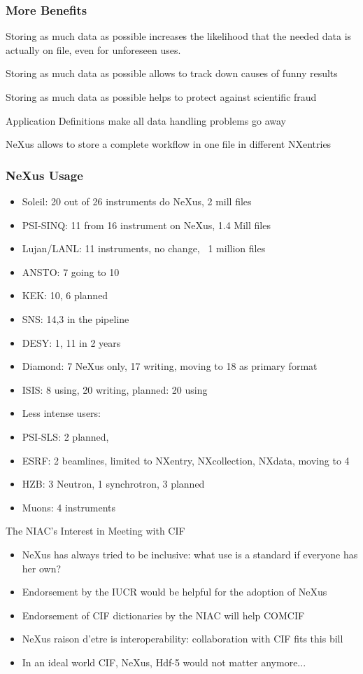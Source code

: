 \documentclass{beamer}
\begin{document}
\begin{frame} \frametitle{More Benefits}
\begin{description}
\item<1->[Benefit 5] Storing as much data as possible increases the likelihood that the needed 
 data is actually on file, even for unforeseen uses. 
\item<2->[Benefit 6] Storing as much data as possible allows to track down causes of funny results 
\item<3->[Benefit 7] Storing as much data as possible helps to protect against scientific fraud
\item<4->[Benefit 8] Application Definitions make all data handling problems go away
\item<4->[Benefit 9] NeXus allows to store a complete workflow in one file in different NXentries
\end{description}
\end{frame}


\begin{frame}
\frametitle{NeXus Usage}
\begin{itemize}
\item Soleil: 20 out of 26 instruments do NeXus, 2 mill files
\item PSI-SINQ: 11 from 16 instrument on NeXus, 1.4 Mill files
\item Lujan/LANL: 11 instruments, no change, ~1 million files
\item ANSTO: 7 going to 10
\item KEK: 10, 6 planned
\item SNS: 14,3 in the pipeline
\item DESY: 1, 11 in 2 years
\item Diamond: 7 NeXus only, 17 writing, moving to 18 as primary format
\item ISIS: 8 using, 20 writing, planned: 20 using
\item {\color{blue}Less intense users:}
\item PSI-SLS: 2 planned, 
\item ESRF: 2 beamlines, limited to NXentry, NXcollection, NXdata, moving to 4
\item HZB: 3 Neutron, 1 synchrotron, 3 planned 
\item Muons: 4 instruments
\end{itemize}
\end{frame}

\begin{frame}{The NIAC's Interest in Meeting with CIF}
\begin{itemize}
\item NeXus has always tried to be inclusive: what use is a standard if everyone has her own?
\item Endorsement by the IUCR would be helpful for the adoption of NeXus
\item Endorsement of CIF dictionaries by the  NIAC will help COMCIF 
\item NeXus raison d'etre is interoperability: collaboration with CIF fits this bill  
\item In an ideal world CIF, NeXus, Hdf-5 would not matter anymore...
\end{itemize}
\end{frame}
\end{document}
